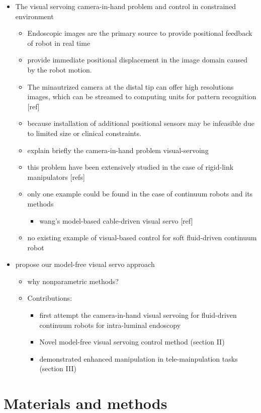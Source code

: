\documentclass[journal,onecolumn]{IEEEtran}
\begin{document}
\begin{itemize}
\item The visual servoing camera-in-hand problem and control in constrained environment 

\begin{itemize}
\item Endoscopic images are the primary source to provide positional feedback of robot in real time
\item provide immediate positional displacement in the image domain caused by the robot motion.
\item The minautrized camera at the distal tip can offer high resolutions images, which can be streamed to computing units for pattern recognition [ref]
\item because installation of additional positional sensors may be infeasible due to limited size or clinical constraints.
\item explain briefly the camera-in-hand problem visual-servoing
\item this problem have been extensively studied in the case of rigid-link manipulators [refs]
\item only one example could be found in the case of continuum robots and its methods
\begin{itemize}
\item wang's model-based cable-driven visual servo [ref]
\end{itemize}
\item no existing example of visual-based control for soft fluid-driven continuum robot
\end{itemize}

\item propose our model-free visual servo approach
\begin{itemize}
\item why nonparametric methods?
\item Contributions:
\begin{itemize}
\item first attempt the camera-in-hand visual servoing for fluid-driven continuum robots for intra-luminal endoscopy
\item Novel model-free visual servoing control method (section II)
\item demonstrated enhanced manipulation in tele-mainpulation tasks (section III)
\end{itemize}
\end{itemize}
\end{itemize}

\section{Materials and methods}
\label{sec:org0ec4b0d}
\end{document}
